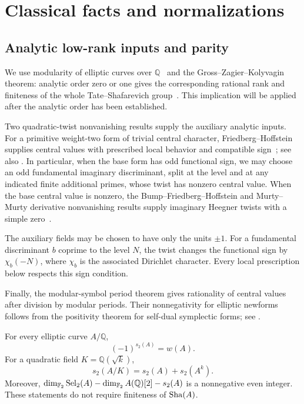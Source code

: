 \section{Classical facts and normalizations}\label{sec:classical}

\subsection{Analytic low-rank inputs and parity}

We use modularity of elliptic curves over \(\mathbb Q\)~\cite{BCDT01}
and the Gross--Zagier--Kolyvagin theorem: analytic order zero or one
gives the corresponding rational rank and finiteness of the whole
Tate--Shafarevich group~\cite{GZ86,Kolyvagin90}. This implication
will be applied after the analytic order has been established.

Two quadratic-twist nonvanishing results supply the auxiliary analytic
inputs. For a primitive weight-two form of trivial central character,
Friedberg--Hoffstein supplies central values with prescribed local
behavior and compatible sign~\cite{FH95}; see also
\cite[Theorem~10.6]{AnandavardhananPrasad13}. In particular, when the
base form has odd functional sign, we may choose an odd fundamental
imaginary discriminant, split at the level and at any indicated finite
additional primes, whose twist has nonzero central value. When the base
central value is nonzero, the Bump--Friedberg--Hoffstein and
Murty--Murty derivative nonvanishing results supply imaginary Heegner
twists with a simple zero~\cite{BFH90,MurtyMurty91}.

The auxiliary fields may be chosen to have only the units \(\pm1\).
For a fundamental discriminant \(b\) coprime to the level \(N\),
the twist changes the functional sign by \(\chi_b(-N)\), where
\(\chi_b\) is the associated Dirichlet character. Every local
prescription below respects this sign condition.

Finally, the modular-symbol period theorem gives rationality of central
values after division by modular periods. Their nonnegativity for
elliptic newforms follows from the positivity theorem for self-dual
symplectic forms; see \cite{LapidRallis03}.

\begin{lemma}\label{lem:classical-parity}
For every elliptic curve \(A/\mathbb Q\),
\[
 (-1)^{s_2(A)}=w(A).
\]
For a quadratic field \(K=\mathbb Q(\sqrt{k})\),
\[
 s_2(A/K)=s_2(A)+s_2(A^k).
\]
Moreover, \(\dim_{\mathbb F_2}\operatorname{Sel}_2(A)-\dim_{\mathbb F_2}A(\mathbb Q)[2]-s_2(A)\) is a nonnegative even integer. These statements do not require finiteness of \(\operatorname{Sha}(A)\).
\end{lemma}

